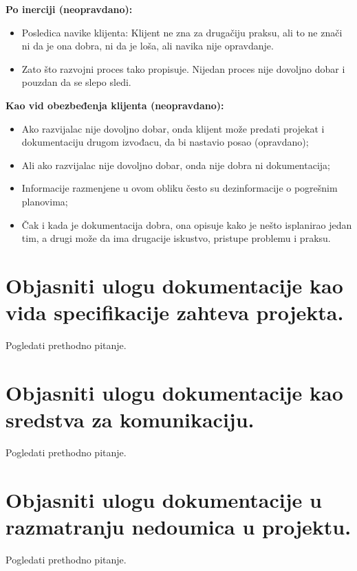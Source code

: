 \documentclass[a4paper]{article}
\begin{document}
  \textbf{Po inerciji (neopravdano):}
  \begin{itemize}
    \item Posledica navike klijenta: Klijent ne zna za drugačiju praksu, ali to ne znači ni da 
          je ona dobra, ni da je loša, ali navika nije opravdanje.
    \item Zato što razvojni proces tako propisuje. Nijedan proces nije dovoljno dobar i pouzdan 
          da se slepo sledi.
  \end{itemize}
  \textbf{Kao vid obezbeđenja klijenta (neopravdano):}
  \begin{itemize}
    \item Ako razvijalac nije dovoljno dobar, onda klijent može predati projekat i dokumentaciju 
          drugom izvođacu, da bi nastavio posao (opravdano);
    \item Ali ako razvijalac nije dovoljno dobar, onda nije dobra ni dokumentacija;
    \item Informacije razmenjene u ovom obliku često su dezinformacije o pogrešnim planovima;
    \item Čak i kada je dokumentacija dobra, ona opisuje kako je nešto isplanirao jedan tim, 
          a drugi može da ima drugacije iskustvo, pristupe problemu i praksu.
  \end{itemize}
  
\section{Objasniti ulogu dokumentacije kao vida specifikacije zahteva projekta.}
  Pogledati prethodno pitanje.
  
\section{Objasniti ulogu dokumentacije kao sredstva za komunikaciju.}
  Pogledati prethodno pitanje.
  
\section{Objasniti ulogu dokumentacije u razmatranju nedoumica u projektu.}
  Pogledati prethodno pitanje.
  
\end{document}
